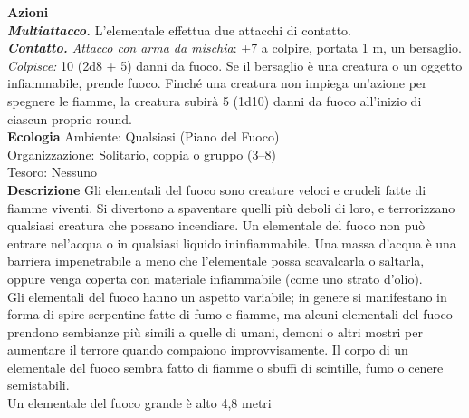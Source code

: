 \begin{multicols}{2}
\smallskip\textbf{Azioni}\\
\emph{\textbf{Multiattacco.}} L'elementale effettua due attacchi di contatto.\\
\emph{\textbf{Contatto.} Attacco con arma da mischia}: +7 a colpire, portata 1 m, un bersaglio.\\
\emph{Colpisce:} 10 (2d8 + 5) danni da fuoco. Se il bersaglio è una creatura o un oggetto infiammabile, prende fuoco. Finché una creatura non impiega un'azione per spegnere le fiamme, la creatura subirà 5 (1d10) danni da fuoco all'inizio di ciascun proprio round.\\
\textbf{Ecologia}
Ambiente: Qualsiasi (Piano del Fuoco)\\
Organizzazione: Solitario, coppia o gruppo (3–8)\\
Tesoro: Nessuno\\
\textbf{Descrizione}
Gli elementali del fuoco sono creature veloci e crudeli fatte di fiamme viventi. Si divertono a spaventare quelli più deboli di loro, e terrorizzano qualsiasi creatura che possano incendiare. Un elementale del fuoco non può entrare nel'acqua o in qualsiasi liquido ininfiammabile. Una massa d’acqua è una barriera impenetrabile a meno che l'elementale possa scavalcarla o saltarla, oppure venga coperta con materiale infiammabile (come uno strato d’olio).\\
Gli elementali del fuoco hanno un aspetto variabile; in genere si manifestano in forma di spire serpentine fatte di fumo e fiamme, ma alcuni elementali del fuoco prendono sembianze più simili a quelle di umani, demoni o altri mostri per aumentare il terrore quando compaiono improvvisamente. Il corpo di un elementale del fuoco sembra fatto di fiamme o sbuffi di scintille, fumo o cenere semistabili.\\

Un elementale del fuoco grande è alto 4,8 metri\\



\end{multicols}
